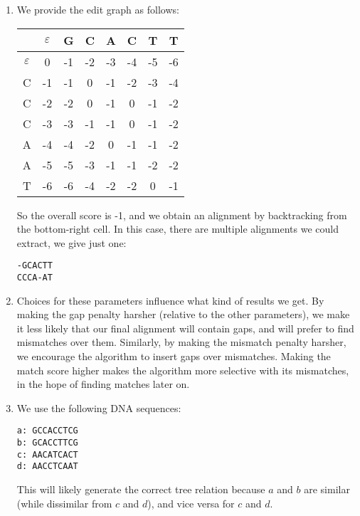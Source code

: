 


\begin{enumerate}[label=(\alph*)]
  \item
    We provide the edit graph as follows:

    \begin{tabular}{c|c|c|c|c|c|c|c}
      &$\varepsilon$&G&C&A&C&T&T\\
      \hline
      $\varepsilon$& 0&-1&-2&-3&-4&-5&-6\\
      \hline
      C&-1&-1&0&-1&-2&-3&-4\\
      \hline
      C&-2&-2&0&-1&0&-1&-2\\
      \hline
      C&-3&-3&-1&-1&0&-1&-2\\
      \hline
      A&-4&-4&-2&0&-1&-1&-2\\
      \hline
      A&-5&-5&-3&-1&-1&-2&-2\\
      \hline
      T&-6&-6&-4&-2&-2&0&-1\\
    \end{tabular}

    So the overall score is -1, and we obtain an alignment by backtracking from the bottom-right cell. In this case, there are multiple alignments we could extract, we give just one:

\begin{verbatim}
-GCACTT
CCCA-AT
\end{verbatim}

\item
  Choices for these parameters influence what kind of results we get. By making the gap penalty harsher (relative to the other parameters), we make it less likely that our final alignment will contain gaps, and will prefer to find mismatches over them. Similarly, by making the mismatch penalty harsher, we encourage the algorithm to insert gaps over mismatches. Making the match score higher makes the algorithm more selective with its mismatches, in the hope of finding matches later on.

\item

  We use the following DNA sequences:

\begin{verbatim}
a: GCCACCTCG
b: GCACCTTCG
c: AACATCACT
d: AACCTCAAT
\end{verbatim}

This will likely generate the correct tree relation because $a$ and $b$ are similar (while dissimilar from $c$ and $d$), and vice versa for $c$ and $d$.


\end{enumerate}
